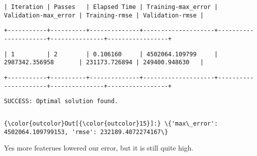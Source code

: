 \documentclass[11pt]{article}
\begin{document}
    
    
    \begin{verbatim}
| Iteration | Passes   | Elapsed Time | Training-max_error | Validation-max_error | Training-rmse | Validation-rmse |
    \end{verbatim}

    
    
    \begin{verbatim}
+-----------+----------+--------------+--------------------+----------------------+---------------+-----------------+
    \end{verbatim}

    
    
    \begin{verbatim}
| 1         | 2        | 0.106160     | 4502064.109799     | 2987342.356958       | 231173.726894 | 249400.948630   |
    \end{verbatim}

    
    
    \begin{verbatim}
+-----------+----------+--------------+--------------------+----------------------+---------------+-----------------+
    \end{verbatim}

    
    
    \begin{verbatim}
SUCCESS: Optimal solution found.
    \end{verbatim}

    
    
    \begin{verbatim}

    \end{verbatim}

    
\begin{Verbatim}[commandchars=\\\{\}]
{\color{outcolor}Out[{\color{outcolor}15}]:} \{'max\_error': 4502064.109799153, 'rmse': 232189.4072274167\}
\end{Verbatim}
            
    Yes more featerues lowered our error, but it is still quite high.
\end{document}
